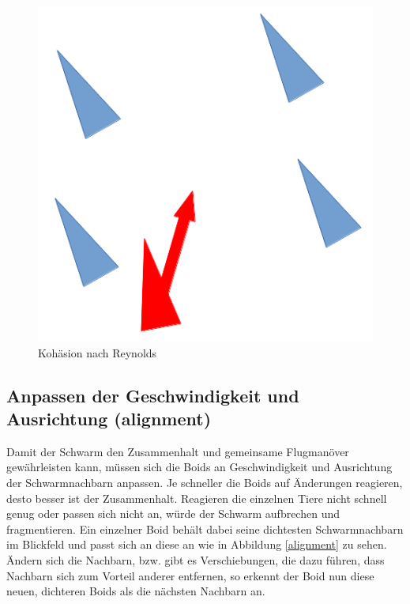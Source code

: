 \documentclass[draft=false
              ,paper=a4
              ,twoside=false
              ,fontsize=11pt
              ,headsepline
              ,BCOR10mm
              ,DIV11
              ,bibtotoc
              ,liststotoc
              ]{scrbook}
\begin{document}
\begin{figure}[!h]
\centering
\includegraphics[scale=0.4]{project/cohesion.png}
\caption{Kohäsion nach Reynolds \cite{reynolds87}}
\label{cohesion}
\end{figure}

\subsection{Anpassen der Geschwindigkeit und Ausrichtung (alignment)}
Damit der Schwarm den Zusammenhalt und gemeinsame Flugmanöver gewährleisten kann, müssen sich die Boids an Geschwindigkeit und Ausrichtung der Schwarmnachbarn anpassen. Je schneller die Boids auf Änderungen reagieren, desto besser ist der Zusammenhalt. Reagieren die einzelnen Tiere nicht schnell genug oder passen sich nicht an, würde der Schwarm aufbrechen und fragmentieren. Ein einzelner Boid behält dabei seine dichtesten Schwarmnachbarn im Blickfeld und passt sich an diese an wie in Abbildung \ref{alignment} zu sehen. Ändern sich die Nachbarn, bzw. gibt es Verschiebungen, die dazu führen, dass Nachbarn sich zum Vorteil anderer entfernen, so erkennt der Boid nun diese neuen, dichteren Boids als die nächsten Nachbarn an.
\end{document}
